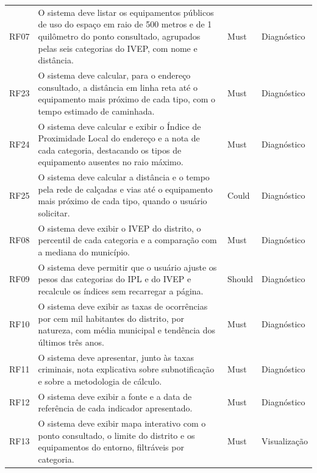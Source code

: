 \begin{longtable}{C{1.2cm}L{9.2cm}C{1.5cm}C{2.2cm}}
	RF07        & O sistema deve listar os equipamentos públicos de uso do espaço em raio de 500 metros e de 1 quilômetro do ponto consultado, agrupados pelas seis categorias do IVEP, com nome e distância. & Must            & Diagnóstico     \\
	RF23        & O sistema deve calcular, para o endereço consultado, a distância em linha reta até o equipamento mais próximo de cada tipo, com o tempo estimado de caminhada.                              & Must            & Diagnóstico     \\
	RF24        & O sistema deve calcular e exibir o Índice de Proximidade Local do endereço e a nota de cada categoria, destacando os tipos de equipamento ausentes no raio máximo.                          & Must            & Diagnóstico     \\
	RF25        & O sistema deve calcular a distância e o tempo pela rede de calçadas e vias até o equipamento mais próximo de cada tipo, quando o usuário solicitar.                                         & Could           & Diagnóstico     \\
	RF08        & O sistema deve exibir o IVEP do distrito, o percentil de cada categoria e a comparação com a mediana do município.                                                                          & Must            & Diagnóstico     \\
	RF09        & O sistema deve permitir que o usuário ajuste os pesos das categorias do IPL e do IVEP e recalcule os índices sem recarregar a página.                                                       & Should          & Diagnóstico     \\
	RF10        & O sistema deve exibir as taxas de ocorrências por cem mil habitantes do distrito, por natureza, com média municipal e tendência dos últimos três anos.                                      & Must            & Diagnóstico     \\
	RF11        & O sistema deve apresentar, junto às taxas criminais, nota explicativa sobre subnotificação e sobre a metodologia de cálculo.                                                                & Must            & Diagnóstico     \\
	RF12        & O sistema deve exibir a fonte e a data de referência de cada indicador apresentado.                                                                                                         & Must            & Diagnóstico     \\
	RF13        & O sistema deve exibir mapa interativo com o ponto consultado, o limite do distrito e os equipamentos do entorno, filtráveis por categoria.                                                  & Must            & Visualização    \\

\end{longtable}

